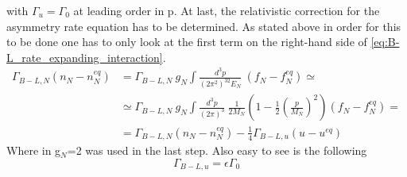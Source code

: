 with $\Gamma_u=\Gamma_0$ at leading order in p. \newline
At last, the relativistic correction for the asymmetry rate equation has to be determined. As stated above in order for this to be done one has to only look at the first term on the right-hand side of \ref{eq:B-L_rate_expanding_interaction}.
\begin{align*}
	\Gamma_{B-L,N}\left(n_N-n_N^{eq}\right)&=\Gamma_{B-L,N}\:g_N\int \frac{d^3p}{\left(2\pi^2\right)^32E_N}\:\left(f_N-f_N^{eq}\right)\simeq\\
	&\simeq\Gamma_{B-L,N}\:g_N\int\frac{d^3p}{\left(2\pi\right)^3}\:\frac{1}{2M_N}\left(1-\frac{1}{2}\left(\frac{p}{M_N}\right)^2\right)\left(f_N-f_N^{eq}\right)=\\
	&=\Gamma_{B-L,N}\left(n_N-n_N^{eq}\right)-\frac{1}{4}\Gamma_{B-L,u}\left(u-u^{eq}\right)
\end{align*}
Where in g$_N$=2 was used in the last step.\newline
Also easy to see is the following
\begin{equation*}
	\Gamma_{B-L,u}=\epsilon\Gamma_0
\end{equation*}
